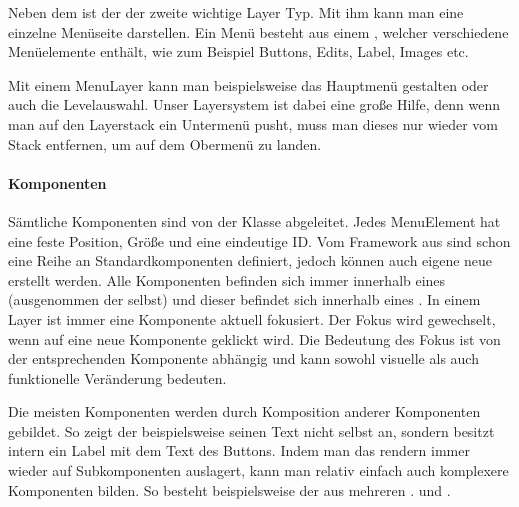 Neben dem  ist der  der zweite wichtige Layer Typ. Mit ihm kann man eine einzelne Menüseite darstellen.
Ein Menü besteht aus einem , welcher verschiedene Menüelemente enthält, wie zum Beispiel Buttons, Edits, Label, Images etc.

Mit einem MenuLayer kann man beispielsweise das Hauptmenü gestalten oder auch die Levelauswahl. Unser Layersystem ist dabei eine große Hilfe, denn wenn man auf den Layerstack ein Untermenü pusht, muss man dieses nur wieder vom Stack entfernen, um auf dem Obermenü zu landen.

\paragraph{Komponenten}

Sämtliche Komponenten sind von der Klasse  abgeleitet. Jedes MenuElement hat eine feste Position, Größe und eine eindeutige ID. Vom Framework aus sind schon eine Reihe an Standardkomponenten definiert, jedoch können auch eigene neue erstellt werden.
Alle Komponenten befinden sich immer innerhalb eines  (ausgenommen der  selbst) und dieser befindet sich innerhalb eines . In einem Layer ist immer eine Komponente aktuell fokusiert. Der Fokus wird gewechselt, wenn auf eine neue Komponente geklickt wird. Die Bedeutung des Fokus ist von der entsprechenden Komponente abhängig und kann sowohl visuelle als auch funktionelle Veränderung bedeuten.


Die meisten Komponenten werden durch Komposition anderer Komponenten gebildet. So zeigt der  beispielsweise seinen Text nicht selbst an, sondern besitzt intern ein Label mit dem Text des Buttons. Indem man das rendern immer wieder auf Subkomponenten auslagert, kann man relativ einfach auch komplexere Komponenten bilden. So besteht beispielsweise der  aus mehreren .  und . 

